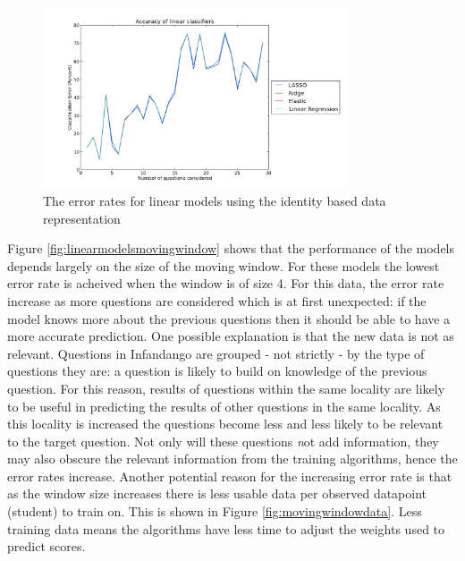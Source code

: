 \begin{figure}[h!]
\centering
\includegraphics[width=0.8\textwidth]{images/linearmodelsidentified.png}
\caption{The error rates for linear models using the identity based data representation}
\label{fig:linearmodelsidentified}
\end{figure}

Figure \ref{fig:linearmodelsmovingwindow} shows that the performance of the models depends largely on the size of the moving window. For these models the lowest error rate is acheived when the window is of size 4. For this data, the error rate increase as more questions are considered which is at first unexpected: if the model knows more about the previous questions then it should be able to have a more accurate prediction. 
One possible explanation is that the new data is not as relevant. Questions in Infandango are grouped - not strictly - by the type of questions they are: a question is likely to build on knowledge of the previous question. For this reason, results of questions within the same locality are likely to be useful in predicting the results of other questions in the same locality. As this locality is increased the questions become less and less likely to be relevant to the target question. Not only will these questions {\textit not add} information, they may also obscure the relevant information from the training algorithms, hence the error rates increase.
Another potential reason for the increasing error rate is that as the window size increases there is less usable data per observed datapoint (student) to train on. This is shown in Figure \ref{fig:movingwindowdata}. Less training data means the algorithms have less time to adjust the weights used to predict scores.

